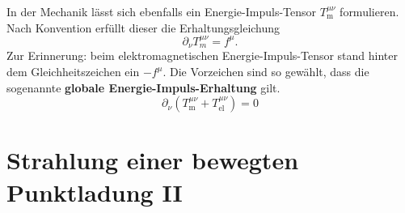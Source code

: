 In der Mechanik lässt sich ebenfalls ein Energie-Impuls-Tensor $T^{\mu\nu}_\text{m}$ formulieren. Nach Konvention erfüllt dieser die Erhaltungsgleichung 
\begin{equation*}
\partial_\nu T_m^{\mu\nu} = f^\mu.
\end{equation*}
Zur Erinnerung: beim elektromagnetischen Energie-Impuls-Tensor stand hinter dem Gleichheitszeichen ein $-f^\mu$. Die Vorzeichen sind so gewählt, dass die sogenannte \textbf{globale Energie-Impuls-Erhaltung} gilt.
\begin{equation*}
\partial_\nu\left(T_\text{m}^{\mu\nu} + T^{\mu\nu}_\text{el}\right) = 0
\end{equation*}

\section{Strahlung einer bewegten Punktladung II}

